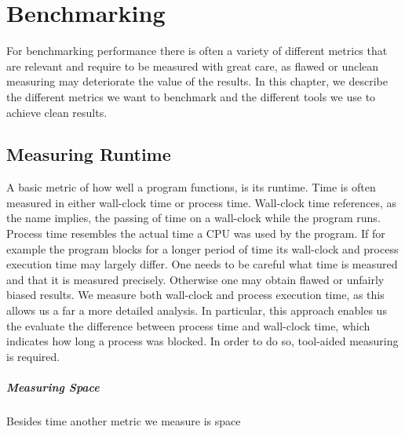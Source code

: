 \chapter{Benchmarking}
For benchmarking performance there is often a variety of different metrics that are relevant and require to be measured with great care, as flawed or unclean measuring may deteriorate the value of the results. In this chapter, we describe the different metrics we want to benchmark and the different tools we use to achieve clean results. 

\section{Measuring Runtime}
A basic metric of how well a program functions, is its runtime. Time is often measured in either wall-clock time or process time. Wall-clock time references, as the name implies, the passing of time on a wall-clock while the program runs. 
Process time resembles the actual time a CPU was used by the program. If for example the program blocks for a longer period of time its wall-clock and process execution time may largely differ.    One needs to be careful what time is measured and that it is measured precisely. Otherwise one may obtain flawed or unfairly biased results. We measure both wall-clock and process execution time, as this allows us a far a more detailed analysis. In particular, this approach enables us the evaluate the difference between process time and wall-clock time, which indicates how long a process was blocked. In order to do so, tool-aided measuring is required.

\paragraph{Measuring Space}
Besides time another metric we measure is space

